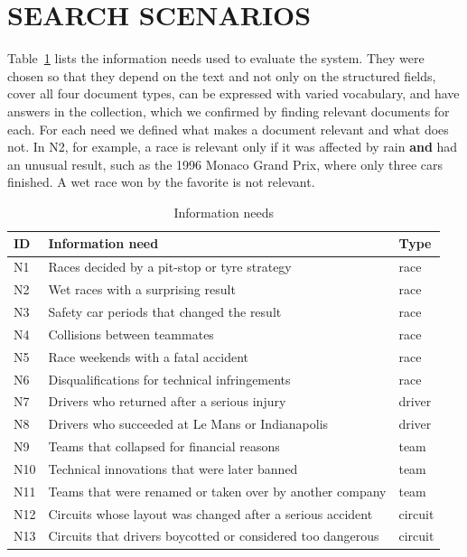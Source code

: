 \documentclass[sigconf]{acmart}
\begin{document}
\section{SEARCH SCENARIOS}
\label{sec:needs}
Table~\ref{tab:needs} lists the information needs used to
evaluate the system. They were chosen so that they depend on the text and
not only on the structured fields, cover all four document types, can be
expressed with varied vocabulary, and have answers in the collection, which
we confirmed by finding relevant documents for each. For each need we
defined what makes a document relevant and what does not. In N2, for
example, a race is relevant only if it was affected by rain \textbf{and}
had an unusual result, such as the 1996 Monaco Grand Prix, where only three
cars finished. A wet race won by the favorite is not relevant.

\begin{table}[ht]
  \small
  \begin{tabular}{lp{5.4cm}l}
    \toprule
    ID & Information need & Type \\
    \midrule
    N1 & Races decided by a pit-stop or tyre strategy & race \\
    N2 & Wet races with a surprising result & race \\
    N3 & Safety car periods that changed the result & race \\
    N4 & Collisions between teammates & race \\
    N5 & Race weekends with a fatal accident & race \\
    N6 & Disqualifications for technical infringements & race \\
    N7 & Drivers who returned after a serious injury & driver \\
    N8 & Drivers who succeeded at Le Mans or Indianapolis & driver \\
    N9 & Teams that collapsed for financial reasons & team \\
    N10 & Technical innovations that were later banned & team \\
    N11 & Teams that were renamed or taken over by another company & team \\
    N12 & Circuits whose layout was changed after a serious accident & circuit \\
    N13 & Circuits that drivers boycotted or considered too dangerous & circuit \\
    \bottomrule
  \end{tabular}
  \caption{Information needs}
  \label{tab:needs}
\end{table}
\end{document}

